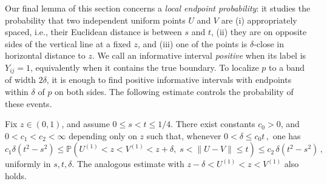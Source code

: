 \documentclass[ECP,preprint]{ejpecp} %
\newcommand{\1}{\mathbf 1}
\newcommand{\PP}{\mathbb P}
\begin{document}
Our final lemma of this section concerns a \emph{local endpoint probability}: it studies the probability that two independent uniform points $U$ and $V$ are (i) appropriately spaced, i.e., their Euclidean distance is between $s$ and $t$, (ii) they are on opposite sides of the vertical line at a fixed $z$, and (iii) one of the points is $\delta$-close in horizontal distance to $z$. We call an informative interval \emph{positive} when its label is \(Y_{ij}=1\), equivalently when it contains the true boundary. To localize \(p\) to a band of width \(2\delta\), it is enough to find positive informative intervals with endpoints within \(\delta\) of \(p\) on both sides. The following estimate controls the probability of these events.

\medskip 

\begin{lemma} \label{lem:local-endpoint}
    Fix \(z\in (0,1)\), and assume \(0\le s<t\le 1/4\).  There exist constants \(c_0>0\), and \(0<c_1<c_2<\infty\) depending only on $z$ such that, whenever
    \(
        0<\delta\le c_0t \, ,
    \)
    one has
    \begin{equation} \label{eq-local-ep}
        c_1\delta(t^2-s^2)
        \le
        \PP\left(
        U^{(1)}<z<V^{(1)}<z+\delta,\;
        s<\|U-V\|\le t
        \right)
        \le
        c_2 \, \delta(t^2-s^2) \, ,
    \end{equation}
    uniformly in \(s,t,\delta\).  The analogous estimate with
    \(
        z-\delta<U^{(1)} < z < V^{(1)}
    \)
    also holds.
\end{lemma}
\end{document}
